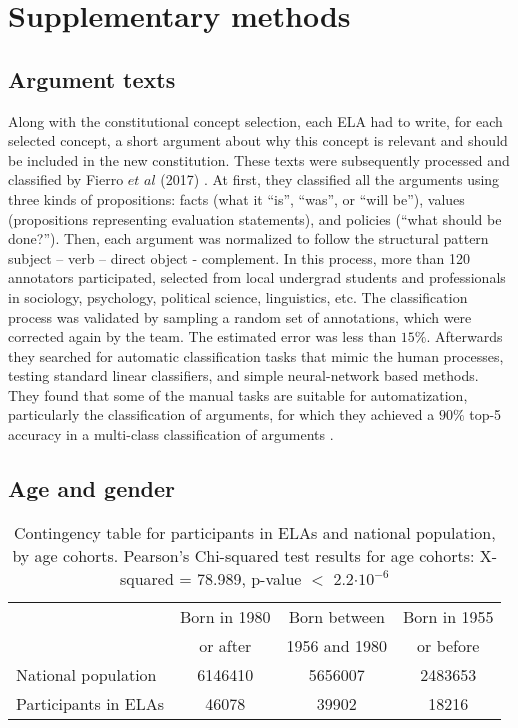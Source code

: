 \documentclass[onecolumn]{article}
\begin{document}
\pagebreak

\section{Supplementary methods}

\subsection{Argument texts}\label{SMet1}
Along with the constitutional concept selection, each ELA had to write, for each selected concept, a short argument about why this concept is relevant and should be included in the new constitution. These texts were subsequently processed and classified by Fierro $et$ $al$ (2017) \cite{fierro2017}. At first, they classified all the arguments using three kinds of propositions: facts (what it “is”, “was”, or “will be”), values (propositions representing evaluation statements), and policies (“what should be done?”). Then, each argument was normalized to follow the structural pattern subject – verb – direct object -  complement. In this process, more than 120 annotators participated, selected from local undergrad students and professionals in sociology, psychology, political science, linguistics, etc. The classification process was validated by sampling a random set of annotations, which were corrected again by the team.  The estimated error was less than $15\%$. Afterwards they searched for automatic classification tasks that mimic the human processes, testing standard linear classifiers, and simple neural-network based methods. They found that some of the manual tasks are suitable for automatization, particularly the classification of arguments, for which they achieved a $90\%$ top-5 accuracy in a multi-class classification of arguments \cite{fierro2017}.


\subsection{Age and gender}\label{sec:SMdata}

\begin{table}[h!]
\caption{Contingency table for  participants in ELAs and national population, by age cohorts. Pearson's Chi-squared test results for age cohorts: X-squared = 78.989,  p-value $<$ 2.2$\cdot 10^{-6}$}
\label{tab:age_chi}
\centering
\begin{tabular}{|l|c|c|c|}
\hline 
 & Born in 1980   & Born between  & Born in 1955 \\ 
 & or after  & 1956 and 1980 &   or before \\ 
\hline 
National population & 6146410 & 5656007 & 2483653 \\ 
Participants in ELAs & 46078 & 39902 & 18216 \\ 
\hline 
\end{tabular}
\end{table}
\end{document}

